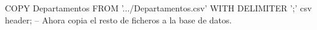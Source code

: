 \lstset{caption=Ejemplo de COPY,label=sql:copy}
\begin{SQL}
COPY Departamentos FROM '.../Departamentos.csv' WITH DELIMITER ';' csv header;
-- Ahora copia el resto de ficheros a la base de datos.
\end{SQL}
